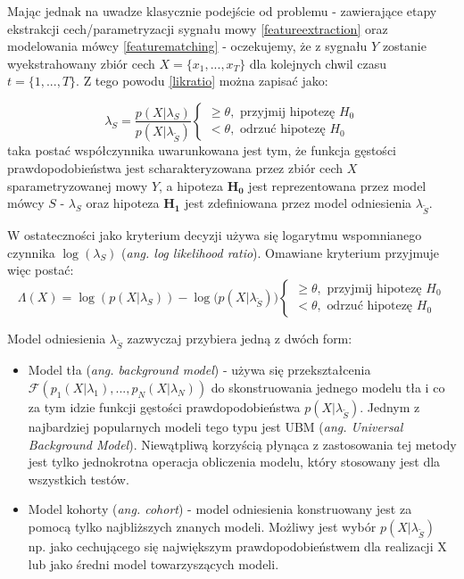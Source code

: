 Mając jednak na uwadze klasycznie podejście od problemu - zawierające etapy ekstrakcji cech/parametryzacji sygnału mowy \ref{featureextraction} oraz modelowania mówcy \ref{featurematching} - oczekujemy, że z sygnału $Y$ zostanie wyekstrahowany zbiór cech $X = \{x_1,...,x_T\}$ dla kolejnych chwil czasu $t = \{1,...,T\}$. Z tego powodu \ref{likratio} można zapisać jako:

\begin{equation}
  \lambda_S = \frac{p(X|\lambda_S)}{p(X|\lambda_{\tilde{S}})}
  \begin{cases}
    \ge \theta, \textrm{ przyjmij hipotezę } H_0 \\
    < \theta, \textrm{ odrzuć hipotezę } H_0
  \end{cases}
\end{equation}
taka postać współczynnika uwarunkowana jest tym, że funkcja gęstości prawdopodobieństwa jest scharakteryzowana przez zbiór cech $X$ sparametryzowanej mowy $Y$, a hipoteza $\bm{H_0}$ jest reprezentowana przez model mówcy $S$ - $\lambda_{S}$  oraz hipoteza $\bm{H_1}$ jest zdefiniowana przez model odniesienia $\lambda_{\tilde{S}}$.

W ostateczności jako kryterium decyzji używa się logarytmu wspomnianego czynnika $\log \left( \lambda_S \right)$ (\textit{ang. log likelihood ratio}). Omawiane kryterium przyjmuje więc postać:
\begin{equation}
  \label{loglike}
    \Lambda(X)= \log({p(X|\lambda_S)}) - \log({p(X|\lambda_{\tilde{S}}))}
  \begin{cases}
    \ge \theta, \textrm{ przyjmij hipotezę } H_0 \\
    < \theta, \textrm{ odrzuć hipotezę } H_0
  \end{cases}
\end{equation}

Model odniesienia $\lambda_{\tilde{S}}$ zazwyczaj przybiera jedną z dwóch form:
\begin{itemize}
  \item{Model tła (\textit{ang. background model})} - używa się przekształcenia $\mathcal{F}(p_1(X|\lambda_1),...,p_N(X|\lambda_N))$ do skonstruowania jednego modelu tła i co za tym idzie funkcji gęstości prawdopodobieństwa $p(X|\lambda_{\tilde{S}})$. Jednym z najbardziej popularnych modeli tego typu jest UBM (\textit{ang. Universal Background Model}). Niewątpliwą korzyścią płynąca z zastosowania tej metody jest tylko jednokrotna operacja obliczenia modelu, który stosowany jest dla wszystkich testów.
  \item{Model kohorty (\textit{ang. cohort})} - model odniesienia konstruowany jest za pomocą tylko najbliższych znanych modeli. Możliwy jest wybór $p(X|\lambda_{\tilde{S}})$ np. jako cechującego się największym prawdopodobieństwem dla realizacji X lub jako średni model towarzyszących modeli.
\end{itemize}


